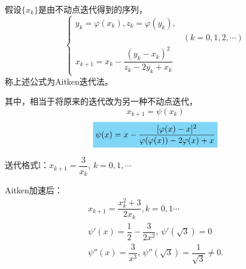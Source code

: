 \begin{definition}[Aitken迭代法]
    假设$\{x_k\}$是由不动点迭代得到的序列，
    \[
       \left\{
        \begin{array}{ll}
            y_k=\varphi(x_k),z_k=\varphi(y_k), & \\
             &(k=0,1,2,\cdots)\\
            x_{k+1}=x_k-\dfrac{(y_k-x_k)^2}{z_k-2y_k+x_k} &
        \end{array}
    \right.
    \]
    称上述公式为Aitken迭代法。

    其中，相当于将原来的迭代改为另一种不动点迭代，
    \[
        x_{k+1}=\psi(x_k)
    \]
    \[
        \colorbox{cyan!50}{$\psi(x)=x-\dfrac{[\varphi(x)-x]^{2}}{\varphi(\varphi(x))-2\varphi(x)+x}$}
    \]
\end{definition}
\begin{example}
    送代格式l：$x_{k+ 1}= \dfrac{3}{x_k}$, $k= 0,1,\cdots$
    \begin{solution}
        Aitken加速后：
        \[
            \begin{array}{c}
                    x_{k+ 1}= \dfrac {x_k^2+ 3}{2x_k}, k= 0,1\cdots\\
                    \psi'(x)=\dfrac{1}{2}-\dfrac{3}{2x^2},\, \psi'(\sqrt{3})=0\\
                    \psi''(x)=\dfrac{3}{x^3},\,\psi''(\sqrt{3})=\dfrac{1}{\sqrt{3}}\neq 0.
            \end{array}
        \]
    \end{solution}
\end{example}
